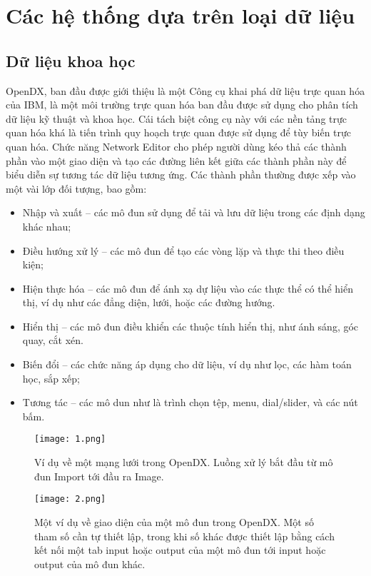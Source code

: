 \documentclass[13pt]{scrartcl} %
\begin{document}
\section{Các hệ thống dựa trên loại dữ liệu}

\subsection{Dữ liệu khoa học}

OpenDX, ban đầu được giới thiệu là một Công cụ khai phá dữ liệu trực quan hóa của IBM, là một môi trường trực quan hóa ban đầu được sử dụng cho phân tích dữ liệu kỹ thuật và khoa học. Cái tách biệt công cụ này với các nền tảng trực quan hóa khá là tiến trình quy hoạch trực quan được sử dụng để tùy biến trực quan hóa. Chức năng Network Editor cho phép người dùng kéo thả các thành phần vào một giao diện và tạo các đường liên kết giữa các thành phần này để biểu diễn sự tương tác dữ liệu tương ứng. Các thành phần thường được xếp vào một vài lớp đối tượng, bao gồm:
\begin{itemize}
    \item Nhập và xuất – các mô đun sử dụng để tải và lưu dữ liệu trong các định dạng khác nhau;
    \item Điều hướng xử lý – các mô đun để tạo các vòng lặp và thực thi theo điều kiện;
    \item Hiện thực hóa – các mô đun để ánh xạ dự liệu vào các thực thể có thể hiển thị, ví dụ như các đẳng diện, lưới, hoặc các đường hướng.
    \item Hiển thị – các mô đun điều khiển các thuộc tính hiển thị, như ánh sáng, góc quay, cắt xén.
    \item Biến đổi – các chức năng áp dụng cho dữ liệu, ví dụ như lọc, các hàm toán học, sắp xếp;
    \item Tương tác – các mô dun như là trình chọn tệp, menu, dial/slider, và các nút bấm.
\end{itemize}

\begin{figure}[!ht] %
    \centering
    \texttt{[image: 1.png]}
    \caption{Ví dụ về một mạng lưới trong OpenDX. Luồng xử lý bắt đầu từ mô đun Import tới đầu ra Image.}
\end{figure}

\begin{figure}[!ht] %
    \centering
    \texttt{[image: 2.png]}
    \caption{Một ví dụ về giao diện của một mô đun trong OpenDX. Một số tham số cần tự thiết lập, trong khi số khác được thiết lập bằng cách kết nối một tab input hoặc output của một mô đun tới input hoặc output của mô đun khác.}
\end{figure}
\end{document}
